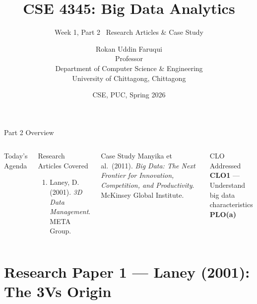 \documentclass[aspectratio=169,10pt]{beamer}
\title[CSE 4345 \textbar{} Week 1, Part 2]{CSE 4345: Big Data Analytics}
\subtitle{Week 1, Part 2 \textemdash\  Research Articles \& Case Study}
\author[Dept.\ of CSE]{{\sc Rokan Uddin Faruqui} \\ Professor \\ Department of Computer Science \& Engineering\\[4pt]
       \small University of Chittagong, Chittagong}
\institute{}
\date{CSE, PUC, Spring 2026}
\begin{document}

\begin{frame}
  \titlepage
\end{frame}

\begin{frame}{Part 2 Overview}
  \begin{columns}[T]
      \begin{block}{Today's Agenda}
        \tableofcontents
      \end{block}

      \begin{exampleblock}{Research Articles Covered}
        \begin{enumerate}
          \item Laney, D. (2001). \textit{3D Data Management}. META Group.
        \end{enumerate}
      \end{exampleblock}
      \vspace{6pt}
      \begin{alertblock}{Case Study}
        Manyika et al.\ (2011). \textit{Big Data: The Next Frontier for Innovation, Competition, and Productivity}. McKinsey Global Institute.
      \end{alertblock}
      \vspace{4pt}
      \begin{block}{CLO Addressed}
        \textbf{CLO1} — Understand big data characteristics\\
        \textbf{PLO(a)}
      \end{block}
  \end{columns}
\end{frame}

\section{Research Paper 1 — Laney (2001): The 3Vs Origin}
\end{document}
